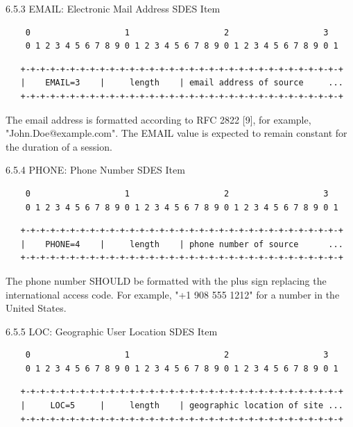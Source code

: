 \documentclass{article}
\begin{document}
6.5.3 EMAIL: Electronic Mail Address SDES Item

\begin{verbatim}
    0                   1                   2                   3
    0 1 2 3 4 5 6 7 8 9 0 1 2 3 4 5 6 7 8 9 0 1 2 3 4 5 6 7 8 9 0 1
\end{verbatim}

\begin{verbatim}
   +-+-+-+-+-+-+-+-+-+-+-+-+-+-+-+-+-+-+-+-+-+-+-+-+-+-+-+-+-+-+-+-+
   |    EMAIL=3    |     length    | email address of source     ...
   +-+-+-+-+-+-+-+-+-+-+-+-+-+-+-+-+-+-+-+-+-+-+-+-+-+-+-+-+-+-+-+-+
\end{verbatim}

The email address is formatted according to RFC 2822 [9], for example, "John.Doe@example.com".  The EMAIL value is expected to remain constant for the duration of a session.

6.5.4 PHONE: Phone Number SDES Item

\begin{verbatim}
    0                   1                   2                   3
    0 1 2 3 4 5 6 7 8 9 0 1 2 3 4 5 6 7 8 9 0 1 2 3 4 5 6 7 8 9 0 1
\end{verbatim}

\begin{verbatim}
   +-+-+-+-+-+-+-+-+-+-+-+-+-+-+-+-+-+-+-+-+-+-+-+-+-+-+-+-+-+-+-+-+
   |    PHONE=4    |     length    | phone number of source      ...
   +-+-+-+-+-+-+-+-+-+-+-+-+-+-+-+-+-+-+-+-+-+-+-+-+-+-+-+-+-+-+-+-+
\end{verbatim}

The phone number SHOULD be formatted with the plus sign replacing the international access code.  For example, "+1 908 555 1212" for a number in the United States.

6.5.5 LOC: Geographic User Location SDES Item

\begin{verbatim}
    0                   1                   2                   3
    0 1 2 3 4 5 6 7 8 9 0 1 2 3 4 5 6 7 8 9 0 1 2 3 4 5 6 7 8 9 0 1
\end{verbatim}

\begin{verbatim}
   +-+-+-+-+-+-+-+-+-+-+-+-+-+-+-+-+-+-+-+-+-+-+-+-+-+-+-+-+-+-+-+-+
   |     LOC=5     |     length    | geographic location of site ...
   +-+-+-+-+-+-+-+-+-+-+-+-+-+-+-+-+-+-+-+-+-+-+-+-+-+-+-+-+-+-+-+-+
\end{verbatim}
\end{document}
